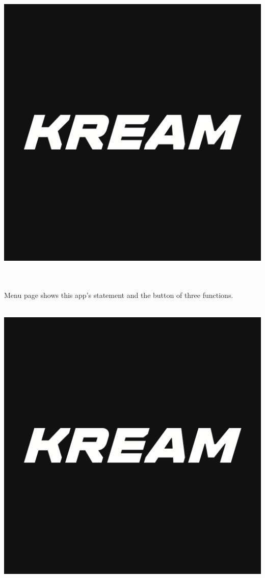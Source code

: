 \documentclass[conference]{IEEEtran}
\begin{document}
\begin{enumerate}
\centerline{\includegraphics[scale=0.2]{pics/KREAM.png}}\\
\\Menu page shows this app’s statement and the button of three functions.\\\\
	\begin{enumerate}
\centerline{\includegraphics[scale=0.2]{pics/KREAM.png}}

\end{enumerate}
\end{enumerate}
\end{document}
